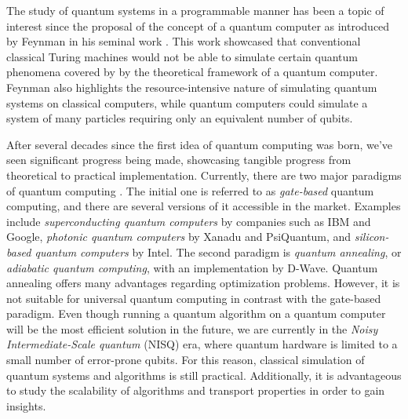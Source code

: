 \documentclass[main.tex]{subfiles}
\begin{document}

The study of quantum systems in a programmable manner has been a topic of
interest since the proposal of the concept of a quantum computer as introduced
by Feynman in his seminal work \cite{feynman1982}. This work showcased that
conventional classical Turing machines would not be able to simulate certain
quantum phenomena covered by by the theoretical framework of a quantum
computer. Feynman also highlights the resource-intensive nature of simulating
quantum systems on classical computers, while quantum computers could simulate
a system of many particles requiring only an equivalent number of qubits.\par

After several decades since the first idea of quantum computing was born, we've
seen significant progress being made, showcasing tangible progress from
theoretical to practical implementation. Currently, there are two major
paradigms of quantum computing \cite{willschLecture22}. The initial one is
referred to as \textit{gate-based} quantum computing, and there are several
versions of it accessible in the market. Examples include
\textit{superconducting quantum computers} by companies such as IBM and Google,
\textit{photonic quantum computers} by Xanadu and PsiQuantum, and
\textit{silicon-based quantum computers} by Intel. The second paradigm is
\textit{quantum annealing}, or \textit{adiabatic quantum computing}, with an
implementation by D-Wave. Quantum annealing offers many advantages regarding
optimization problems. However, it is not suitable for universal quantum
computing in contrast with the gate-based paradigm. Even though running a
quantum algorithm on a quantum computer will be the most efficient solution in
the future, we are currently in the \textit{Noisy Intermediate-Scale quantum}
(NISQ) era, where quantum hardware is limited to a small number of error-prone
qubits. For this reason, classical simulation of quantum systems and algorithms
is still practical. Additionally, it is advantageous to study the scalability
of algorithms and transport properties in order to gain insights.\par
\end{document}
